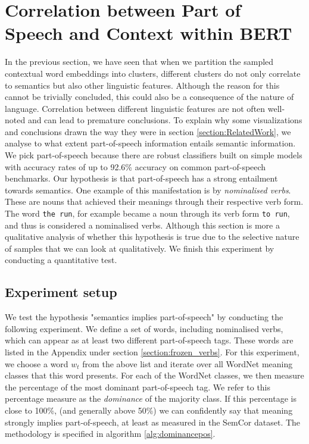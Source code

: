 \documentclass[a4paper,12pt,oneside,openright]{report}
\begin{document}
\section{Correlation between Part of Speech and Context within BERT} \label{correlation_pos_context}

In the previous section, we have seen that when we partition the sampled contextual word embeddings into clusters, different clusters do not only correlate to semantics but also other linguistic features.
Although the reason for this cannot be trivially concluded, this could also be a consequence of the nature of language.
Correlation between different linguistic features are not often well-noted and can lead to premature conclusions. 
To explain why some visualizations and conclusions drawn the way they were in section \ref{section:RelatedWork}, we analyse to what extent part-of-speech information entails semantic information.
We pick part-of-speech because there are robust classifiers built on simple models with accuracy rates of up to 92.6\% accuracy on common part-of-speech benchmarks.
Our hypothesis is that part-of-speech has a strong entailment towards semantics.
One example of this manifestation is by \textit{nominalised verbs}.
These are nouns that achieved their meanings through their respective verb form.
The word \Verb#the run#, for example became a noun through its verb form \Verb#to run#, and thus is considered a nominalised verbs.
Although this section is more a qualitative analysis of whether this hypothesis is true due to the selective nature of samples that we can look at qualitatively.
We finish this experiment by conducting a quantitative test.

\subsection{Experiment setup}

We test the hypothesis "semantics implies part-of-speech" by conducting the following experiment.
We define a set of words, including nominalised verbs, which can appear as at least two different part-of-speech tags.
These words are listed in the Appendix under section \eqref{section:frozen_verbs}.
For this experiment, we choose a word $w_t$ from the above list and iterate over all WordNet meaning classes that this word presents.
For each of the WordNet classes, we then measure the percentage of the most dominant part-of-speech tag.
We refer to this percentage measure as the \textit{dominance} of the majority class.
If this percentage is close to 100\%, (and generally above 50\%) we can confidently say that meaning strongly implies part-of-speech, at least as measured in the SemCor dataset.
The methodology is specified in algorithm \ref{alg:dominancepos}.
\end{document}
